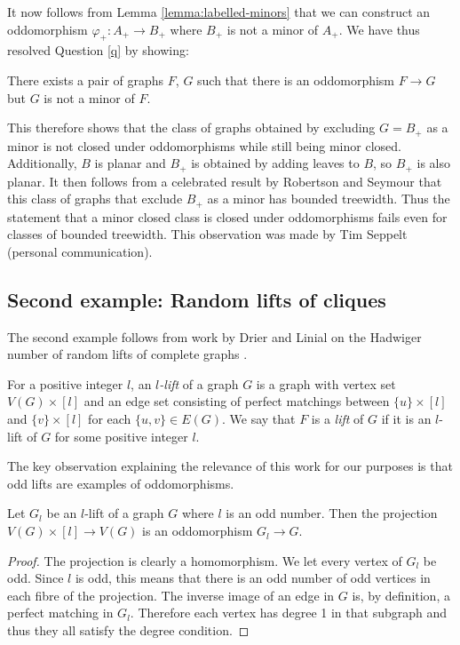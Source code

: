 \documentclass[11pt]{article}
\begin{document}
It now follows from Lemma \ref{lemma:labelled-minors} that we can construct an oddomorphism $\varphi_+: A_+ \to B_+$ where $B_+$ is not a minor of $A_+$. We have thus resolved Question \ref{q} by showing:
\begin{theorem}
    There exists a pair of graphs $F$, $G$ such that there is an oddomorphism $F \to G$ but $G$ is not a minor of $F$.
\end{theorem}


This therefore shows that the class of graphs obtained by excluding $G = B_+$ as a minor is not closed under oddomorphisms while still being minor closed.
Additionally, $B$ is planar and $B_+$ is obtained by adding leaves to $B$, so $B_+$ is also planar. It then follows from a celebrated result by Robertson and Seymour \cite{ROBERTSON198692} that this class of graphs that exclude $B_+$ as a minor has bounded treewidth.
Thus the statement that a minor closed class is closed under oddomorphisms fails even for classes of bounded treewidth.
This observation was made by Tim Seppelt (personal communication).



\subsection{Second example: Random lifts of cliques}
The second example follows from work by Drier and Linial on the Hadwiger number of random lifts of complete graphs \cite{Drier2004Minors}. \par 
For a positive integer $l$, an \emph{$l$-lift} of a graph $G$ is a graph with vertex set $V(G) \times [l]$ and an edge set consisting of perfect matchings between $\{u\} \times [l]$ and $\{v\} \times [l]$ for each $\{u,v\} \in E(G)$. We say that $F$ is a \emph{lift} of $G$ if it is an $l$-lift of $G$ for some positive integer $l$.
\par 
The key observation explaining the relevance of this work for our purposes is that odd lifts are examples of oddomorphisms.
\begin{proposition}
    Let $G_l$ be an $l$-lift of a graph $G$ where $l$ is an odd number. Then the projection $V(G) \times [l] \to V(G)$ is an oddomorphism $G_l \to G$.
\end{proposition}
\begin{proof}
    The projection is clearly a homomorphism.
    We let every vertex of $G_l$ be odd. Since $l$ is odd, this means that there is an odd number of odd vertices in each fibre of the projection. The inverse image of an edge in $G$ is, by definition, a perfect matching in $G_l$. Therefore each vertex has degree 1 in that subgraph and thus they all satisfy the degree condition.
\end{proof}
\end{document}
